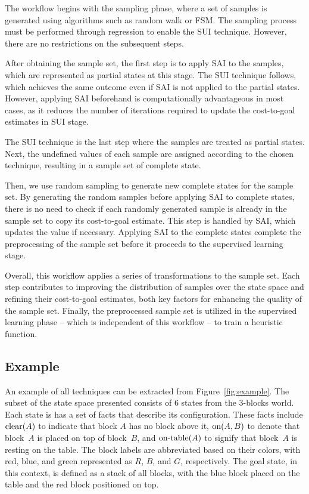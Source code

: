 The workflow begins with the sampling phase, where a set of samples is generated using algorithms such as random walk or FSM. The sampling process must be performed through regression to enable the SUI technique. However, there are no restrictions on the subsequent steps. 

After obtaining the sample set, the first step is to apply SAI to the samples, which are represented as partial states at this stage. The SUI technique follows, which achieves the same outcome even if SAI is not applied to the partial states. However, applying SAI beforehand is computationally advantageous in most cases, as it reduces the number of iterations required to update the cost-to-goal estimates in SUI stage.

The SUI technique is the last step where the samples are treated as partial states. Next, the undefined values of each sample are assigned according to the chosen technique, resulting in a sample set of complete state.

Then, we use random sampling to generate new complete states for the sample set. By generating the random samples before applying SAI to complete states, there is no need to check if each randomly generated sample is already in the sample set to copy its cost-to-goal estimate. This step is handled by SAI, which updates the value if necessary. Applying SAI to the complete states complete the preprocessing of the sample set before it proceeds to the supervised learning stage.

Overall, this workflow applies a series of transformations to the sample set. Each step contributes to improving the distribution of samples over the state space and refining their cost-to-goal estimates, both key factors for enhancing the quality of the sample set. Finally, the preprocessed sample set is utilized in the supervised learning phase -- which is independent of this workflow -- to train a heuristic function.

\subsection{Example}
\label{sec:example}

An example of all techniques can be extracted from Figure~\ref{fig:example}. The subset of the state space presented consists of $6$ states from the $3$-blocks world. Each state is has a set of facts that describe its configuration. These facts include $\text{clear}(A)$ to indicate that block $A$ has no block above it, $\text{on}(A,B)$ to denote that block~$A$ is placed on top of block~$B$, and $\text{on-table}(A)$ to signify that block~$A$ is resting on the table. The block labels are abbreviated based on their colors, with red, blue, and green represented as $R$, $B$, and $G$, respectively. The goal state, in this context, is defined as a stack of all blocks, with the blue block placed on the table and the red block positioned on top.

